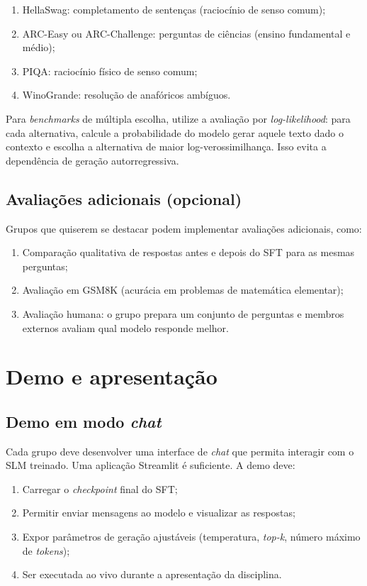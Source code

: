 \documentclass{dlproblemset}
\begin{document}
\begin{enumerate}[1)]
    \item HellaSwag: completamento de sentenças (raciocínio de senso comum);
    \item ARC-Easy ou ARC-Challenge: perguntas de ciências (ensino fundamental e médio);
    \item PIQA: raciocínio físico de senso comum;
    \item WinoGrande: resolução de anafóricos ambíguos.
\end{enumerate}

Para \textit{benchmarks} de múltipla escolha, utilize a avaliação por \textit{log-likelihood}: para cada alternativa, calcule a probabilidade do modelo gerar aquele texto dado o contexto e escolha a alternativa de maior log-verossimilhança. Isso evita a dependência de geração autorregressiva.

\subsection*{Avaliações adicionais (opcional)}

Grupos que quiserem se destacar podem implementar avaliações adicionais, como:

\begin{enumerate}[1)]
    \item Comparação qualitativa de respostas antes e depois do SFT para as mesmas perguntas;
    \item Avaliação em GSM8K (acurácia em problemas de matemática elementar);
    \item Avaliação humana: o grupo prepara um conjunto de perguntas e membros externos avaliam qual modelo responde melhor.
\end{enumerate}

\section*{Demo e apresentação}

\subsection*{Demo em modo \textit{chat}}

Cada grupo deve desenvolver uma interface de \textit{chat} que permita interagir com o SLM treinado. Uma aplicação Streamlit é suficiente. A demo deve:

\begin{enumerate}[1)]
    \item Carregar o \textit{checkpoint} final do SFT;
    \item Permitir enviar mensagens ao modelo e visualizar as respostas;
    \item Expor parâmetros de geração ajustáveis (temperatura, \textit{top-k}, número máximo de \textit{tokens});
    \item Ser executada ao vivo durante a apresentação da disciplina.
\end{enumerate}
\end{document}
